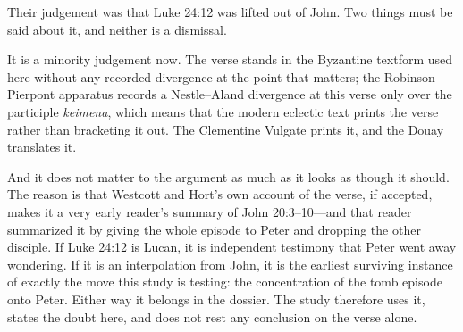 Their judgement was that Luke 24:12 was lifted out of John. Two things must be
said about it, and neither is a dismissal.

It is a minority judgement now. The verse stands in the Byzantine textform
used here without any recorded divergence at the point that matters; the
Robinson--Pierpont apparatus records a Nestle--Aland divergence at this verse
only over the participle \emph{keimena}, which means that the modern eclectic
text prints the verse rather than bracketing it out. The
Clementine Vulgate prints it, and the Douay translates it.

And it does not matter to the argument as much as it looks as though it should.
The reason is that Westcott and Hort's own account of the verse, if accepted,
makes it a very early reader's summary of John 20:3--10---and that reader
summarized it by giving the whole episode to Peter and dropping the other
disciple. If Luke 24:12 is Lucan, it is independent testimony that Peter went
away wondering. If it is an interpolation from John, it is the earliest
surviving instance of exactly the move this study is testing: the
concentration of the tomb episode onto Peter. Either way it belongs in the
dossier. The study therefore uses it, states the doubt here, and does not rest
any conclusion on the verse alone.
